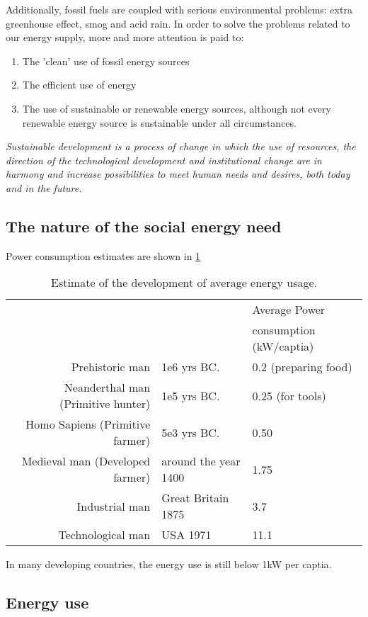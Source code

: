 \documentclass[a4paper,10pt]{article}
\begin{document}
Additionally, fossil fuels are coupled with serious environmental problems: extra greenhouse effect, smog and acid rain.  In order to solve the problems related to our energy supply, more and more attention is paid to:
\begin{enumerate}
 \item The 'clean' use of fossil energy sources
 \item The efficient use of energy
 \item The use of sustainable or renewable energy sources, although not every renewable energy source is sustainable under all circumstances.
\end{enumerate}

\emph{Sustainable development is a process of change in which the use of resources, the direction of the technological development and institutional change are in harmony and increase possibilities to meet human needs and desires, both today and in the future.}

\subsection{The nature of the social energy need}

Power consumption estimates are shown in \cref{tab:pc}

\begin{table}[ht]
  \begin{tabular}{rll}
   && Average Power \\
   && consumption (kW/captia) \\ \hline
   Prehistoric man & 1e6 yrs BC.  & 0.2 (preparing food)\\
   Neanderthal man (Primitive hunter) & 1e5 yrs BC. & 0.25 (for tools)\\
   Homo Sapiens (Primitive farmer) & 5e3 yrs BC. & 0.50 \\
   Medieval man (Developed farmer) & around the year 1400 & 1.75 \\
   Industrial man & Great Britain 1875 & 3.7 \\
   Technological man & USA 1971 & 11.1
  \end{tabular}
\caption{Estimate of the development of average energy usage.}
\label{tab:pc}
\end{table}

In many developing countries, the energy use is still below 1kW per captia.

\subsection{Energy use}
\end{document}

